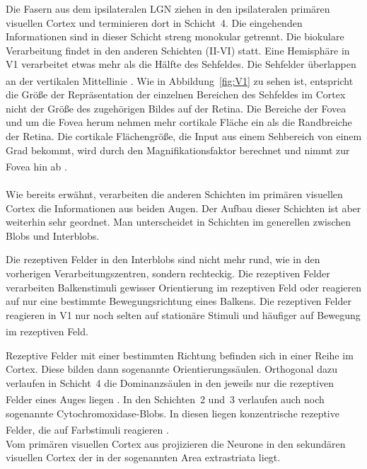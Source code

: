 \documentclass[12pt,a4paper,pdftex]{article}
\begin{document}
Die Fasern aus dem ipsilateralen LGN ziehen in den ipsilateralen primären visuellen Cortex und terminieren dort in Schicht~4. Die eingehenden Informationen sind in dieser Schicht streng monokular getrennt. Die biokulare Verarbeitung findet in den anderen Schichten (II-VI) statt. Eine Hemisphäre in V1 verarbeitet etwas mehr als die Hälfte des Sehfeldes. Die Sehfelder überlappen an der vertikalen Mittellinie \textsuperscript{\cite[25]{kandel2013principles}}.
Wie in Abbildung~\ref{fig:V1} zu sehen ist, entspricht die Größe der Repräsentation der einzelnen Bereichen des Sehfeldes im Cortex nicht der Größe des zugehörigen Bildes auf der Retina. Die Bereiche der Fovea und um die Fovea herum nehmen mehr cortikale Fläche ein als die Randbreiche der Retina. Die cortikale Flächengröße, die Input aus einem Sehbereich von einem Grad bekommt, wird durch den Magnifikationsfaktor berechnet und nimmt zur Fovea hin ab \textsuperscript{\cite[25]{kandel2013principles}}.
\\
\\
\noindent Wie bereits erwähnt, verarbeiten die anderen Schichten im primären visuellen Cortex die Informationen aus beiden Augen. Der Aufbau dieser Schichten ist aber weiterhin sehr geordnet. Man unterscheidet in Schichten im generellen zwischen Blobs und Interblobs.

Die rezeptiven Felder in den Interblobs sind nicht mehr rund, wie in den vorherigen Verarbeitungszentren, sondern rechteckig. Die rezeptiven Felder verarbeiten Balkenstimuli gewisser Orientierung im rezeptiven Feld oder reagieren auf nur eine bestimmte Bewegungsrichtung eines Balkens. Die rezeptiven Felder reagieren in V1 nur noch selten auf stationäre Stimuli und häufiger auf Bewegung im rezeptiven Feld. \textsuperscript{\cite[18]{smith2008biology}}

Rezeptive Felder mit einer bestimmten Richtung befinden sich in einer Reihe im Cortex. Diese bilden dann sogenannte Orientierungssäulen. Orthogonal dazu verlaufen in Schicht~4 die Dominanzsäulen in den jeweils nur die rezeptiven Felder eines Auges liegen \textsuperscript{\cite[10]{neurowissenschaften_baer}}.
In den Schichten~2 und~3 verlaufen auch noch sogenannte Cytochromoxidase-Blobs. In diesen liegen konzentrische rezeptive Felder, die auf Farbstimuli reagieren \textsuperscript{\cite[18]{smith2008biology}}.\\

\noindent Vom primären visuellen Cortex aus projizieren die Neurone in den sekundären visuellen Cortex der in der sogenannten Area extrastriata liegt. 
\end{document}
